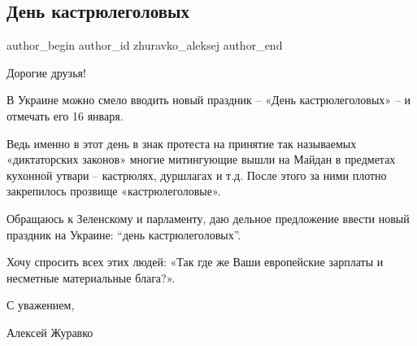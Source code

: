  
 
 
 
 
 
\subsection{День кастрюлеголовых}
\label{sec:01_12_2021.fb.zhuravko_aleksej.4.den_kastrjulegolovyh}
 
\ifcmt
 author_begin
   author_id zhuravko_aleksej
 author_end
\fi

Дорогие друзья!

В Украине можно смело вводить новый праздник – «День кастрюлеголовых» – и
отмечать его 16 января. 


Ведь именно в этот день в знак протеста на принятие так называемых
«диктаторских законов» многие митингующие вышли на Майдан в предметах кухонной
утвари – кастрюлях, дуршлагах и т.д. После этого за ними плотно закрепилось
прозвище «кастрюлеголовые». 

Обращаюсь к Зеленскому и парламенту, даю дельное предложение ввести новый
праздник на Украине: \enquote{день кастрюлеголовых}.

Хочу спросить всех этих людей: «Так где же Ваши европейские зарплаты и
несметные материальные блага?».

С уважением,

Алексей Журавко

